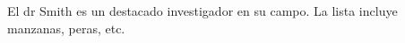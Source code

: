 \documentclass{article}
\begin{document}
El \gls{dr} Smith es un destacado investigador en su campo. La lista incluye manzanas, peras, \gls{etc}.

\printglossaries
\end{document}
